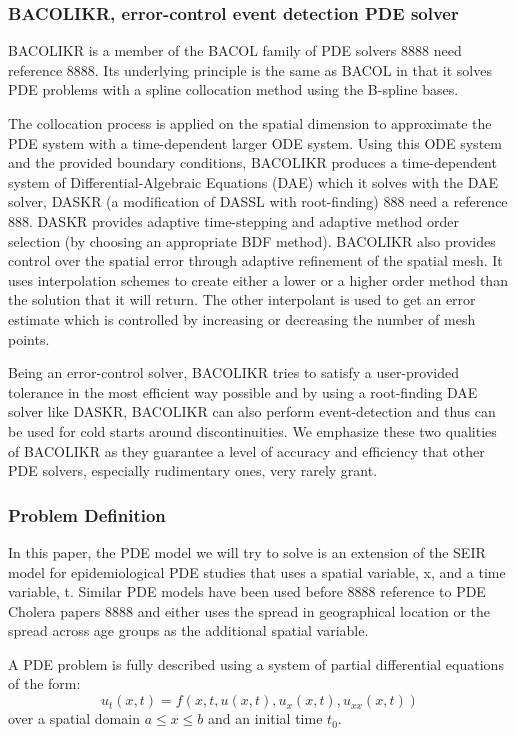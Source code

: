 \documentclass{article}
\begin{document}
\subsubsection{BACOLIKR, error-control event detection PDE solver}
\label{subsection:pde_software}
BACOLIKR is a member of the BACOL family of PDE solvers 8888 need reference 8888. Its underlying principle is the same as BACOL in that it solves PDE problems with a spline collocation method using the B-spline bases. 

The collocation process is applied on the spatial dimension to approximate the PDE system with a time-dependent larger ODE system. Using this ODE system and the provided boundary conditions, BACOLIKR produces a time-dependent system of Differential-Algebraic Equations (DAE) which it solves with the DAE solver, DASKR (a modification of DASSL with root-finding) 888 need a reference 888. DASKR provides adaptive time-stepping and adaptive method order selection (by choosing an appropriate BDF method). BACOLIKR also provides control over the spatial error through adaptive refinement of the spatial mesh. It uses interpolation schemes to create either a lower or a higher order method than the solution that it will return. The other interpolant is used to get an error estimate which is controlled by increasing or decreasing the number of mesh points.

Being an error-control solver, BACOLIKR tries to satisfy a user-provided tolerance in the most efficient way possible and by using a root-finding DAE solver like DASKR, BACOLIKR can also perform event-detection and thus can be used for cold starts around discontinuities. We emphasize these two qualities of BACOLIKR as they guarantee a level of accuracy and efficiency that other PDE solvers, especially rudimentary ones, very rarely grant.

\subsubsection{Problem Definition}
\label{subsection:pde_problem_def}
In this paper, the PDE model we will try to solve is an extension of the SEIR model for epidemiological PDE studies that uses a spatial variable, x, and a time variable, t. Similar PDE models have been used before 8888 reference to PDE Cholera papers 8888 and either uses the spread in geographical location or the spread across age groups as the additional spatial variable.

A PDE problem is fully described using a system of partial differential equations of the form:
\begin{equation}
u_t(x, t) = f(x, t, u(x,t), u_x(x,t), u_{xx}(x,t))
\end{equation} 
over a spatial domain ${a \leq x \leq b}$ and an initial time ${t_0}$. 
\end{document}
